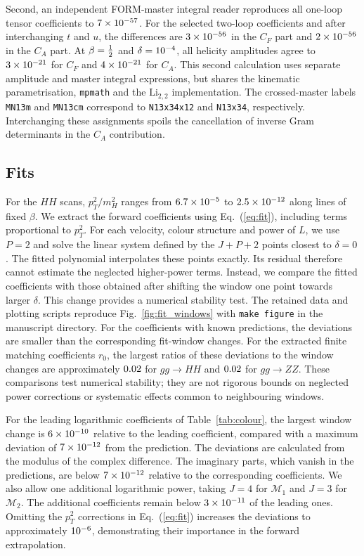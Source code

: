 \documentclass[%
 onecolumn,
 superscriptaddress,
 preprintnumbers,
 nofootinbib,
 amsmath,amssymb,
 aps,
 prl,
]{revtex4-2}
\newcommand{\M}{\mathcal M}
\begin{document}
Second, an independent FORM-master integral
reader reproduces all \zzBenchOneLoopCount{}
one-loop tensor coefficients to
$7\times10^{-57}$.
For the selected two-loop coefficients
\zzBenchCFList{} and
\zzBenchCFListX{} after interchanging
$t$ and $u$, the differences are
$3\times10^{-56}$ in the $C_F$ part
and $2\times10^{-56}$ in the $C_A$ part.
At $\beta=\frac12$ and
$\delta=10^{-4}$, all
\zzForwardCFCount{} helicity amplitudes
agree to $3\times10^{-21}$ for $C_F$
and $4\times10^{-21}$ for $C_A$.
%
This second calculation uses separate
amplitude and master integral expressions,
but shares the kinematic parametrisation,
\texttt{mpmath} and the
$\mathrm{Li}_{2,2}$ implementation.
The crossed-master labels
\texttt{MN13m} and \texttt{MN13cm}
correspond to \texttt{N13x34x12}
and \texttt{N13x34}, respectively.
Interchanging these assignments spoils
the cancellation of inverse Gram
determinants in the $C_A$ contribution.


\subsection{Fits}
\label{app:fits}

For the $HH$ scans, $p_T^2/m_H^2$
ranges from $6.7\times10^{-5}$ to $2.5\times10^{-12}$
along lines of fixed $\beta$.
We extract the forward coefficients
using Eq.~(\ref{eq:fit}), including
terms proportional to $p_T^2$.
%
For each velocity, colour structure
and power of $L$, we use $P=2$
and solve the linear system defined
by the $J+P+2$ points closest to
$\delta=0$. The fitted polynomial
interpolates these points exactly.
Its residual therefore cannot estimate
the neglected higher-power terms.
%
Instead, we compare the fitted coefficients
with those obtained after shifting the
window one point towards larger $\delta$.
This change provides a numerical stability
test. The retained data and plotting scripts reproduce
Fig.~\ref{fig:fit_windows} with \texttt{make figure}
in the manuscript directory.
%
For the coefficients with known predictions,
the deviations are smaller than the
corresponding fit-window changes.
For the extracted finite matching coefficients
$r_0$, the largest ratios of these deviations
to the window changes are approximately
$0.02$ for $gg\to HH$ and
$0.02$ for $gg\to ZZ$.
These comparisons test numerical stability;
they are not rigorous bounds on neglected
power corrections or systematic effects
common to neighbouring windows.

For the leading logarithmic coefficients
of Table~\ref{tab:colour}, the largest
window change is $6\times10^{-10}$ relative
to the leading coefficient, compared with
a maximum deviation of $7\times10^{-12}$
from the prediction.
The deviations are calculated from the
modulus of the complex difference.
The imaginary parts, which vanish in
the predictions, are below $7\times10^{-12}$
relative to the corresponding coefficients.
%
We also allow one additional logarithmic
power, taking $J=4$ for $\M_1$
and $J=3$ for $\M_2$.
The additional coefficients remain below
$3\times10^{-11}$ of the leading ones.
Omitting the $p_T^2$ corrections
in Eq.~(\ref{eq:fit}) increases the
deviations to approximately $10^{-6}$,
demonstrating their importance in the
forward extrapolation.
\end{document}

